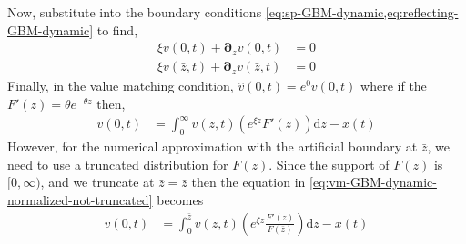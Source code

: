 \documentclass[11pt]{article}
\newcommand{\D}[1][]{\ensuremath{\boldsymbol{\partial}_{#1}}}
\newcommand{\diff}{\ensuremath{\mathrm{d}}}
\begin{document}
\noindent Now, substitute into the boundary conditions \cref{eq:sp-GBM-dynamic,eq:reflecting-GBM-dynamic} to find,
\begin{align}
	\xi v(0,t) + \D[z]v(0,t ) &= 0\label{eq:new-BC1}\\
	\xi v(\bar{z},t) + \D[z]v(\bar{z},t) &= 0\label{eq:new-BC2}
\end{align}
Finally, in the value matching condition, $\hat{v}(0,t) = e^{0} v(0,t)$ where if the $F'(z) = \theta e^{-\theta z}$ then,
\begin{align}
	 v(0,t) &= \int_{0}^{\infty}  v(z,t) \left(e^{\xi z} F'(z)\right) \diff z - x(t)\label{eq:vm-GBM-dynamic-normalized-not-truncated}
\end{align}
However, for the numerical approximation with the artificial boundary at $\bar{z}$, we need to use a truncated distribution for $F(z)$.  Since the support of $F(z)$ is $[0,\infty)$, and we truncate at $\bar{z} = \bar{z}$ then the equation in \cref{eq:vm-GBM-dynamic-normalized-not-truncated} becomes
\begin{align}
	 v(0,t) &= \int_{0}^{\bar{z}}  v(z,t) \left(e^{\xi z} \frac{F'(z)}{F(\bar{z})}\right) \diff z - x(t)\label{eq:vm-GBM-dynamic-normalized}
\end{align}
\end{document}
